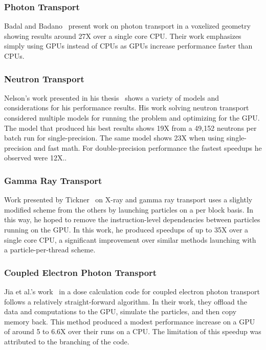 \subsubsection*{\textbf{Photon Transport}}
%
Badal and Badano~\cite{badal2009accelerating} present work on photon transport in a voxelized geometry showing results around 27X over a single core CPU.
%
Their work emphasizes simply using GPUs instead of CPUs as GPUs increase performance faster than CPUs.
%

\subsubsection*{\textbf{Neutron Transport}}
%
Nelson's work presented in his thesis~\cite{nelson2009monte} shows a variety of models and considerations for his performance results.
%
His work solving neutron transport considered multiple models for running the problem and optimizing for the GPU.
%
The model that produced his best results shows 19X from a 49,152 neutrons per batch run for single-precision.
%
The same model shows 23X when using single-precision and fast math.
%
For double-precision performance the fastest speedups he observed were 12X..
%

\subsubsection*{\textbf{Gamma Ray Transport}}
%
Work presented by Tickner~\cite{tickner2010monte} on X-ray and gamma ray transport uses a slightly modified scheme from the others by launching particles on a per block basis.
%
In this way, he hoped to remove the instruction-level dependencies between particles running on the GPU.
%
In this work, he produced speedups of up to 35X over a single core CPU, a significant improvement over similar methods launching with a particle-per-thread scheme.
%

\subsubsection*{\textbf{Coupled Electron Photon Transport}}
%
Jia et al.'s  work~\cite{jia2010development} in a dose calculation code for coupled electron photon transport follows a relatively straight-forward algorithm.
%
In their work, they offload the data and computations to the GPU, simulate the particles, and then copy memory back.
%
This method produced a modest performance increase on a GPU of around 5 to 6.6X over their runs on a CPU.
%
The limitation of this speedup was attributed to the branching of the code.

